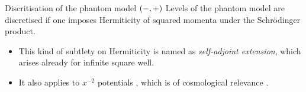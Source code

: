 \documentclass[9pt]{beamer}
\begin{document}
\begin{frame}%
{Discritisation of the phantom model ${\left(-,+\right)}$}%
Levels of the phantom model are \alert{discretised} if one imposes Hermiticity 
of squared momenta under the Schrödinger product.

\begin{itemize}
\item This kind of subtlety on Hermiticity is named as \emph{self-adjoint 
extension}, which arises already for infinite square 
well.
\item It also applies to $x^{-2}$ potentials%
, which is of cosmological relevance%
.
\end{itemize}

\end{frame}
\end{document}
